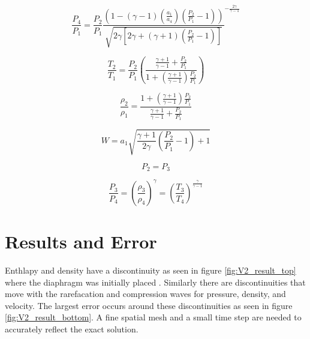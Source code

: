     \begin{equation}
    \label{eq:ref1_7.94}
    	\frac{P_{4}}{P_{1}} = \frac{P_{2}}{P_{1}} \frac{
    	\left( 1 - (\gamma-1)(\frac{a_{1}}{a_{4}})(\frac{P_{2}}{P_{1}} -1) \right) }
    	{\sqrt{2 \gamma \left[ 2 \gamma + (\gamma +1)(\frac{P_{2}}{P_{1}} -1)\right]}}^{
    	- \frac{2 \gamma}{\gamma - 1}}
    \end{equation}
    
    \begin{equation}
    	\frac{T_{2}}{T_{1}} = \frac{P_{2}}{P_{1}} \left(
    	\frac{\frac{\gamma + 1}{\gamma - 1} + \frac{P_{2}}{P_{1}}}
    	{1 + (\frac{\gamma +1}{\gamma - 1}) \frac{P_{2}}{P_{1}}} \right)
    \end{equation}
    
    \begin{equation}
    	\frac{\rho_{2}}{\rho_{1}} =
    	\frac{1 + (\frac{\gamma + 1}{\gamma - 1}) \frac{P_{2}}{P_{1}}}
    	{\frac{\gamma + 1}{\gamma - 1} + \frac{P_{2}}{P_{1}}} 
    \end{equation}
    
    \begin{equation}
    	W = a_{1} \sqrt{ \frac{\gamma + 1}{2 \gamma} 
    	                 \left( \frac{P_{2}}{P_{1}} -1 \right) +1 }
    \end{equation}
    
    \begin{equation}
    	P_{2} = P_{3}
    \end{equation}
    
    \begin{equation}
    	\frac{P_{3}}{P_{4}} = 
    	\left( \frac{\rho_{3}}{\rho_{4}} \right)^{\gamma} =
    	\left( \frac{T_{3}}{T_{4}} \right)^{\frac{\gamma}{\gamma -1}}
    \end{equation}
    
    \section{Results and Error}
    
    Enthlapy and density have a discontinuity as seen in figure
    \ref{fig:V2_result_top} where the diaphragm was initially placed . Similarly
    there are discontinuities that move with the rarefacation and compression
    waves for pressure, density, and velocity. The largest error occurs around
    these discontinuities as seen in figure \ref{fig:V2_result_bottom}. A 
    fine spatial mesh and a small time step are needed to accurately reflect the
    exact solution.
    
